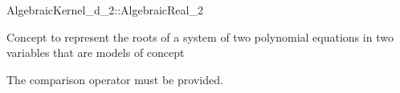 \begin{ccRefConcept}{AlgebraicKernel_d_2::AlgebraicReal_2}

\ccDefinition

Concept to represent the roots of a system of two polynomial equations 
in two variables 
that are models of concept 



\ccOperations

The comparison operator \ccc{==} must be provided. 


\ccHasModels

\ccSeeAlso

\end{ccRefConcept}
